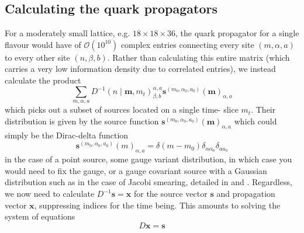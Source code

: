 \documentclass[a4paper,10pt]{book}
\begin{document}
\subsection{Calculating the quark propagators}
For a moderately small lattice, e.g. $18\times18\times 36$, the quark propagator for a single flavour would have of $\mathcal{O}(10^{10})$ complex entries connecting every site $(m,\alpha,a)$ to every other site $(n,\beta,b)$. Rather than calculating this entire matrix (which carries a very low information density due to correlated entries), we instead calculate the product
\begin{equation}
\sum_{m, \alpha, a} D^{-1}(n \mid\boldsymbol{m},m_t)_{\beta,b}^{\alpha,a} \boldsymbol{s}^{\left(m_{0}, \alpha_{0}, a_{0}\right)}(\boldsymbol{m})_{\alpha,a}
\end{equation}
which picks out a subset of sources located on a single time- slice $m_t$. Their distribution is given by the source function $\boldsymbol{s}^{\left(m_{0}, \alpha_{0}, a_{0}\right)}(\boldsymbol{m})_{\alpha,a}$ which could simply be the Dirac-delta function
\begin{equation}
\boldsymbol{s}^{\left(m_{0}, \alpha_{0}, a_{0}\right)}(m)_{\alpha,a}=\delta\left(m-m_{0}\right) \delta_{\alpha \alpha_{0}} \delta_{a a_{0}}
\end{equation}
in the case of a point source, some gauge variant distribution, in which case you would need to fix the gauge, or a gauge covariant source with a Gaussian distribution such as in the case of Jacobi smearing, detailed in \cite{gusken1989non} and \cite{best1997pi}. Regardless, we now need to calculate $D^{-1}\boldsymbol{s} = \boldsymbol{x}$ for the source vector $\boldsymbol{s}$ and propagation vector $\boldsymbol{x}$, suppressing indices for the time being. This amounts to solving the system of equations
\begin{equation} \label{eq:Dx_s}
D\boldsymbol{x}=\boldsymbol{s}
\end{equation}
\end{document}
